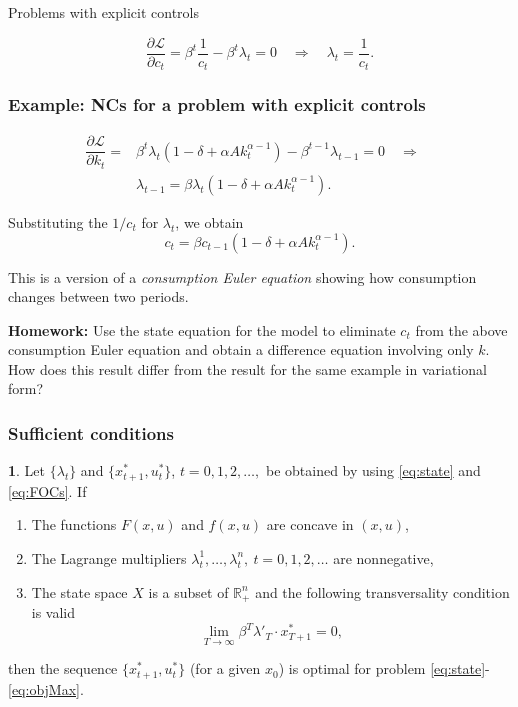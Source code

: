 \documentclass[10pt]{beamer}
\theoremstyle{definition}
\newtheorem{Fact}{\translate{Fact}}
\begin{document}
\begin{section}{Problems with explicit controls}
\begin{frame}[fragile]
\[ \dfrac{\partial \mathcal{L}}{\partial c_t} = \beta^t \dfrac{1}{c_t}- \beta^t \lambda_t = 0 \quad \Rightarrow \quad \lambda_t = \dfrac{1}{c_t}. \]
\end{frame}

\begin{frame}[fragile]
\frametitle{Example: NCs for a problem with explicit controls}
\[\begin{split}
\dfrac{\partial \mathcal{L}}{\partial k_t} =& \beta^t \lambda_t (1-\delta + \alpha A k_t^{\alpha-1}) - \beta^{t-1}\lambda_{t-1} = 0 \quad \Rightarrow \quad \\
&\lambda_{t-1} = \beta \lambda_t (1-\delta + \alpha A k_t^{\alpha-1}).
\end{split} \]

Substituting the $ 1/c_t $ for $ \lambda_t $, we obtain \[ c_t = \beta c_{t-1} (1-\delta + \alpha A k_t^{\alpha-1}). \]

This is a version of a \emph{consumption Euler equation} showing how consumption changes between two periods.\bigskip \pause

\textbf{Homework:} Use the state equation for the model to eliminate $ c_t $ from the above consumption Euler equation and obtain a difference equation involving only $ k $. How does this result differ from the result for the same example in variational form?
\end{frame}


\begin{frame}[fragile]
\frametitle{Sufficient conditions}
\begin{Fact} Let $\{\lambda_t\}$ and $\{x^*_{t+1},u^*_t\}$,
$t=0,1,2,\ldots,$ be obtained by using \eqref{eq:state}
and \eqref{eq:FOCs}. If 
	\begin{enumerate}
	\item The functions $F(x,u)$ and $f(x,u)$
	are concave in $(x,u)$,
	\item The Lagrange multipliers $\lambda_t^1,\ldots,\lambda_t^n,
	~t=0,1,2,\ldots$ are nonnegative,
	\item The state space $X$ is a subset of $\mathbb{R}^n_+$ and the following transversality condition is valid $$\lim_{T\rightarrow \infty} \beta^T \lambda'_T \cdot
	x^*_{T+1}=0,$$
	\end{enumerate} 
then the sequence $\{x^*_{t+1},u^*_t\}$ (for a given $x_0$) is optimal for problem  \eqref{eq:state}-\eqref{eq:objMax}.
\label{fc:sufficiency}\end{Fact}
\end{frame}



\end{section}
\end{document}
